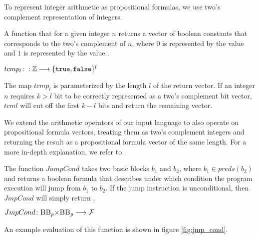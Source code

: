 To represent integer arithmetic as propositional formulas, we use two's complement representation of integers.

\begin{definition}
    A function that for a given integer $n$ returns a vector of boolean constants that corresponds to the two's complement of $n$, where $0$ is represented by the value \fff and $1$ is represented by the value \ttt.
    \begin{center}
        $tcmp_l\colon: \mathbb{Z} \longrightarrow \{ \mathtt{true}, \mathtt{false} \}^l$
    \end{center}
    The map $tcmp_l$ is parameterized by the length $l$ of the return vector. If an integer $n$ requires $k > l$ bit to be correctly represented as a two's complement bit vector, $tcml$ will cut off the first $k - l$ bits and return the remaining vector.
\end{definition}

We extend the arithmetic operators of our input language to also operate on propositional formula vectors, treating them as two's complement integers and returning the result as a propositional formula vector of the same length. For a more in-depth explanation, we refer to \cite{}.
\begin{figure}
    \label{fig:input_deps_computation}


\end{figure}

\begin{definition} The function $JumpCond$ takes two basic blocks $b_1$ and $b_2$, where $b_1 \in preds(b_2)$ and returns a boolean formula that describes under which condition the program execution will jump from $b_1$ to $b_2$. If the jump instruction is unconditional, then $JmpCond$ will simply return \ttt.
    \begin{center}
        $JmpCond\colon \mbb_p \times \mbb_p \longrightarrow \mbform$
    \end{center}
\end{definition}
An example evaluation of this function is shown in figure \ref{fig:jmp_cond}.

